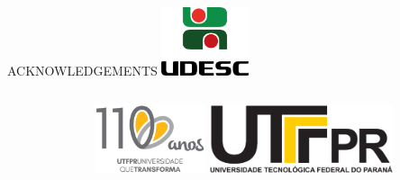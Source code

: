 \documentclass[%
  final,%
  english,%
  english,%
]{beamer}
\begin{document}
\begin{frame}[t, fragile = singleslide]
\begin{columns}[t, onlytextwidth]
\begin{column}{.49\textwidth}
\begin{block}{ACKNOWLEDGEMENTS}
\hspace*{5mm}
\includegraphics[height = 20mm]{./Logos/logo_UDESC_vertical.png}
\end{block}
%

\end{column}
\end{columns}


\begin{columns}[b]
%
\begin{column}{0.49\textwidth}
\end{column}
%
\begin{column}{0.49\textwidth}
\begin{flushright}
\includegraphics[height = 20mm]{./Logos/utfpr-110anos}%
\hspace*{5mm}
\includegraphics[height = 20mm]{./Logos/utfpr}%
\end{flushright}
\end{column}
%
\end{columns}

\vspace*{\baselineskip}

\end{frame}

\end{document}

